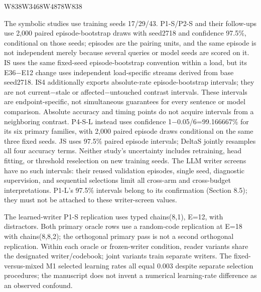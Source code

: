 {\begin{longtable}{W{83}{8}W{346}{8}W{487}{8}W{83}{8}}
\bottomrule
\end{longtable}
}


The symbolic studies use training seeds 17/\allowbreak{}29/\allowbreak{}43. P1-S/\allowbreak{}P2-S and their follow-ups use 2,000 paired  %
episode-bootstrap draws with seed2718 and confidence 97.5\%, conditional on those
seeds; episodes are the pairing units, and the same episode is not independent
merely because several queries or model seeds are scored on it.  %
IS uses the same fixed-seed episode-bootstrap convention within a load, but its
E36\ensuremath{-}E12 change uses independent load-specific streams derived from base seed2718.
 IS4 additionally exports absolute-rate episode-bootstrap intervals;  %
they are not current\ensuremath{-}stale or affected\ensuremath{-}untouched contrast intervals.  %
These intervals are endpoint-specific, not simultaneous guarantees for every
sentence or model comparison. Absolute accuracy and timing points do not acquire
intervals from a neighboring contrast.  %
P4-S-L instead uses confidence 1\ensuremath{-}0.05/\allowbreak{}6=99.166667\% for its six primary families,
with 2,000 paired episode draws conditional on the same three fixed seeds.
 JS uses 97.5\% paired episode intervals; DeltaS jointly resamples all  %
four accuracy terms. Neither study’s uncertainty includes retraining,  %
head fitting, or threshold reselection on new training seeds.  %
The LLM writer screens have no such intervals: their reused validation episodes,
single seed, diagnostic supervision, and sequential selections limit all
cross-arm and cross-budget interpretations.  %
P1-L’s 97.5\% intervals belong to its confirmation (Section 8.5); they must not be
attached to these writer-screen values.  %

The learned-writer P1-S replication uses typed chains(8,1), E=12, with distractors.  %
Both primary oracle rows use a random-code replication at E=18 with chains(8,8,2);
the orthogonal primary pass is not a second orthogonal replication.  %
Within each oracle or frozen-writer condition, reader variants share the designated
writer/\allowbreak{}codebook; joint variants train separate writers.  %
The fixed-versus-mixed M1 selected learning rates all equal 0.003 despite separate
selection procedures; the manuscript does not invent a numerical learning-rate
difference as an observed confound.  %

